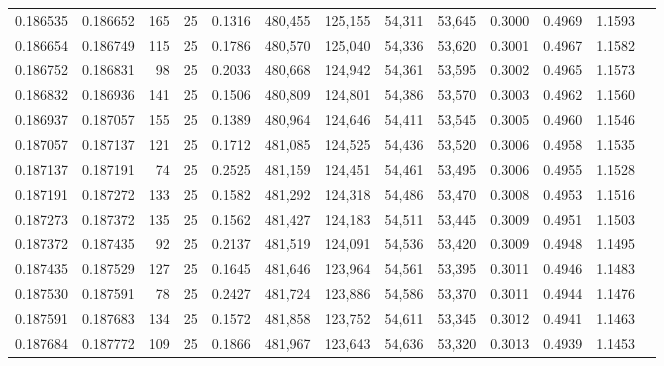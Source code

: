 \begin{tabular}{rrrrrrrrrrrrr}
0.186535 & 0.186652 &   165 &  25 &                                     0.1316 & 480,455 & 125,155 &  54,311 &  53,645 & 0.3000 & 0.4969 & 1.1593 \\
0.186654 & 0.186749 &   115 &  25 &                                     0.1786 & 480,570 & 125,040 &  54,336 &  53,620 & 0.3001 & 0.4967 & 1.1582 \\
0.186752 & 0.186831 &    98 &  25 &                                     0.2033 & 480,668 & 124,942 &  54,361 &  53,595 & 0.3002 & 0.4965 & 1.1573 \\
0.186832 & 0.186936 &   141 &  25 &                                     0.1506 & 480,809 & 124,801 &  54,386 &  53,570 & 0.3003 & 0.4962 & 1.1560 \\
0.186937 & 0.187057 &   155 &  25 &                                     0.1389 & 480,964 & 124,646 &  54,411 &  53,545 & 0.3005 & 0.4960 & 1.1546 \\
0.187057 & 0.187137 &   121 &  25 &                                     0.1712 & 481,085 & 124,525 &  54,436 &  53,520 & 0.3006 & 0.4958 & 1.1535 \\
0.187137 & 0.187191 &    74 &  25 &                                     0.2525 & 481,159 & 124,451 &  54,461 &  53,495 & 0.3006 & 0.4955 & 1.1528 \\
0.187191 & 0.187272 &   133 &  25 &                                     0.1582 & 481,292 & 124,318 &  54,486 &  53,470 & 0.3008 & 0.4953 & 1.1516 \\
0.187273 & 0.187372 &   135 &  25 &                                     0.1562 & 481,427 & 124,183 &  54,511 &  53,445 & 0.3009 & 0.4951 & 1.1503 \\
0.187372 & 0.187435 &    92 &  25 &                                     0.2137 & 481,519 & 124,091 &  54,536 &  53,420 & 0.3009 & 0.4948 & 1.1495 \\
0.187435 & 0.187529 &   127 &  25 &                                     0.1645 & 481,646 & 123,964 &  54,561 &  53,395 & 0.3011 & 0.4946 & 1.1483 \\
0.187530 & 0.187591 &    78 &  25 &                                     0.2427 & 481,724 & 123,886 &  54,586 &  53,370 & 0.3011 & 0.4944 & 1.1476 \\
0.187591 & 0.187683 &   134 &  25 &                                     0.1572 & 481,858 & 123,752 &  54,611 &  53,345 & 0.3012 & 0.4941 & 1.1463 \\
0.187684 & 0.187772 &   109 &  25 &                                     0.1866 & 481,967 & 123,643 &  54,636 &  53,320 & 0.3013 & 0.4939 & 1.1453 \\

\end{tabular}
